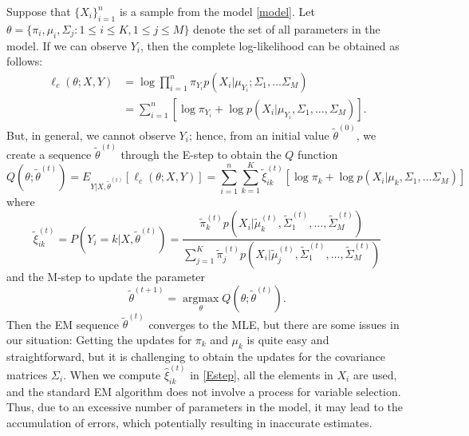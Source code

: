 \documentclass[11pt]{article}
\newcommand{\amax}{\operatorname*{argmax}}
\newcommand{\wh}{\widehat}
\newcommand{\wt}{\widetilde}
\begin{document}
Suppose that $\{X_i\}_{i=1}^n$ is a sample from the model \eqref{model}. Let $\theta=\{\pi_i, \mu_i, \Sigma_j: 1\le i \le K, 1\le j \le M\}$ denote the set of all parameters in the model.
If we can observe $Y_i$, then the complete log-likelihood can be obtained as follows:
\begin{align*}
  \ell_c (\theta;X,Y) & = \log \prod_{i=1}^n \pi_{Y_i} p(X_i|\mu_{Y_i};\Sigma_1,\dots \Sigma_M) \\
  	&= \sum_{i=1}^n [\log\pi_{Y_i}+ \log p(X_i| \mu_{Y_i}, \Sigma_1,\dots , \Sigma_M)].
\end{align*}
But, in general, we cannot observe $Y_i$; hence, from an initial value $\wt\theta^{(0)}$, we create a sequence $\wt\theta^{(t)}$ through the E-step to obtain the $Q$ function
\begin{equation*}
 Q(\theta; \wt\theta^{(t)}) = E_{Y|X,\wt\theta^{(t)}}[\ell_c(\theta;X,Y)] = \sum_{i=1}^n \sum_{k=1}^K \wt \xi_{ik}^{(t)} [ \log \pi_k + \log p(X_i | \mu_k , \Sigma_1,\dots \Sigma_M)]
\end{equation*}
where
\begin{equation}\label{Estep}
  \wt\xi _{ik}^{(t)} = P(Y_i=k| X,\wt\theta^{(t)}) = \frac{\wt\pi_k^{(t)} p(X_i|\wt \mu_k^{(t)}, \wt\Sigma_1^{(t)},  \dots, \wt \Sigma_M^{(t)})}{\sum_{j=1}^K \wt\pi_j^{(t)} p(X_i | \wt\mu_j^{(t)}, \wt\Sigma_1^{(t)}, \dots, \wt\Sigma_M^{(t)})}
\end{equation}
and the M-step to update the parameter
\begin{equation*}
	\wt\theta^{(t+1)} = \amax_\theta Q(\theta; \wt\theta^{(t)}).
\end{equation*}
Then the EM sequence $\wt\theta^{(t)}$ converges to the MLE, but there are some issues in our situation:
Getting the updates for $\pi_k$ and $\mu_k$ is quite easy and straightforward, but it is challenging to obtain the updates for the covariance matrices $\Sigma_i$.
When we compute $\wh\xi^{(t)}_{ik}$ in \eqref{Estep}, all the elements in $X_i$ are used, and the standard EM algorithm does not involve a process for variable selection.
Thus, due to an excessive number of parameters in the model, it may lead to the accumulation of errors, which potentially resulting in inaccurate estimates.
\end{document}
